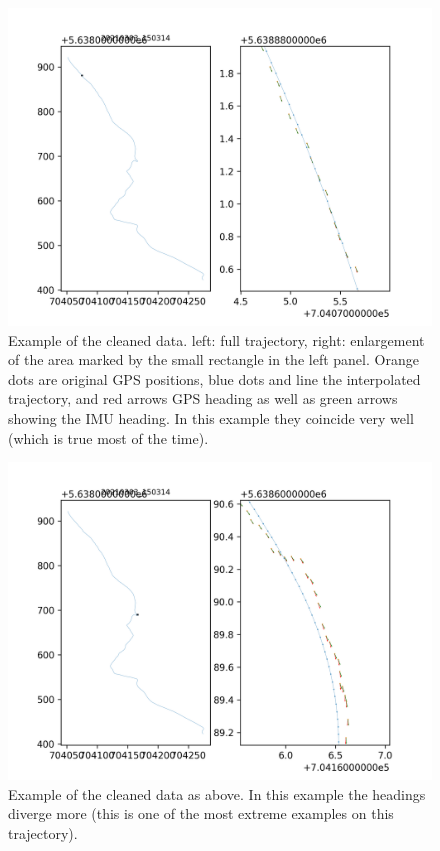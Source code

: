 \documentclass[a4]{article}
\begin{document}
\begin{figure}
  \includegraphics[width=\textwidth]{20210303_150314/frames_deg_1/frame_00809.png}
  \caption{\label{fig:frameEx1} Example of the cleaned data. left:
    full trajectory, right: enlargement of the area marked by the
    small rectangle in the left panel. Orange dots are original GPS
    positions, blue dots and line the interpolated trajectory, and red
    arrows GPS heading as well as green arrows showing the IMU
    heading. In this example they coincide very well (which is true
    most of the time).}
\end{figure}

\begin{figure}
  \includegraphics[width=\textwidth]{20210303_150314/frames_deg_1/frame_03579.png}
  \caption{\label{fig:frameEx2} Example of the cleaned data as
    above. In this example the headings diverge more (this is one of
    the most extreme examples on this trajectory).}
\end{figure}
\end{document}
